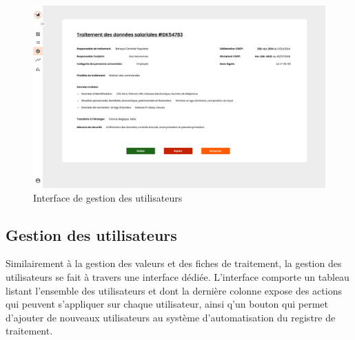 \begin{figure}[H]
    \centering
    \includegraphics[height=.88\textwidth, angle=90]{images/guis/validation.png}
    \caption{Interface de gestion des utilisateurs}
\end{figure}

\clearpage

\subsection{Gestion des utilisateurs}

Similairement à la gestion des valeurs et des fiches de traitement, la gestion des utilisateurs se fait à travers une interface dédiée. L'interface comporte un tableau listant l'ensemble des utilisateurs et dont la dernière colonne expose des actions qui peuvent s'appliquer sur chaque utilisateur, ainsi q'un bouton qui permet d'ajouter de nouveaux utilisateurs au système d'automatisation du registre de traitement. \\

